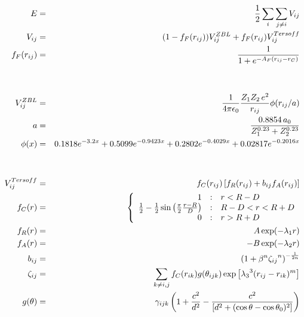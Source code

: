 \documentclass[12pt]{article}
\begin{document}
\begin{eqnarray*}
  E & = & \frac{1}{2} \sum_i \sum_{j \neq i} V_{ij} \\
  V_{ij} & = & (1 - f_F(r_{ij})) V^{ZBL}_{ij} + f_F(r_{ij}) V^{Tersoff}_{ij} \\
f_F(r_{ij}) & = & \frac{1}{1 + e^{-A_F(r_{ij} - r_C)}}\\
  \\
  \\
  V^{ZBL}_{ij} & = & \frac{1}{4\pi\epsilon_0} \frac{Z_1 Z_2 \,e^2}{r_{ij}} \phi(r_{ij}/a) \\
  a & = & \frac{0.8854\,a_0}{Z_{1}^{0.23} + Z_{2}^{0.23}}\\
  \phi(x) & = & 0.1818e^{-3.2x} + 0.5099e^{-0.9423x} + 0.2802e^{-0.4029x} + 0.02817e^{-0.2016x}\\
  \\
  \\
  V^{Tersoff}_{ij} & = & f_C(r_{ij}) \left[ f_R(r_{ij}) + b_{ij} f_A(r_{ij}) \right] \\
  f_C(r) & = & \left\{ \begin{array} {r@{\quad:\quad}l}
    1 & r < R - D \\
    \frac{1}{2} - \frac{1}{2} \sin \left( \frac{\pi}{2} \frac{r-R}{D} \right) &
      R-D < r < R + D \\
    0 & r > R + D
    \end{array} \right. \\
  f_R(r) & = & A \exp (-\lambda_1 r) \\
  f_A(r) & = & -B \exp (-\lambda_2 r) \\
  b_{ij} & = & \left( 1 + \beta^n {\zeta_{ij}}^n \right)^{-\frac{1}{2n}} \\
  \zeta_{ij} & = & \sum_{k \neq i,j} f_C(r_{ik}) g(\theta_{ijk})
                   \exp \left[ {\lambda_3}^3 (r_{ij} - r_{ik})^m \right] \\
  g(\theta) & = & \gamma_{ijk} \left( 1 + \frac{c^2}{d^2} - 
                  \frac{c^2}{\left[ d^2 + 
		  (\cos \theta - \cos \theta_0)^2\right]} \right)
\end{eqnarray*}                           
\end{document}
